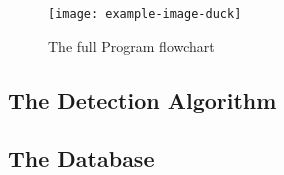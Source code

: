 \begin{figure}[h!]
    \centering
    \texttt{[image: example-image-duck]}
    \caption{The full Program flowchart}
    \label{fig:my_label}
\end{figure}


\newpage
\subsection{The Detection Algorithm}


\newpage
\subsection{The Database}

